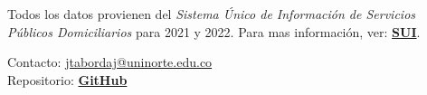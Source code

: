 \documentclass[12pt,a4paper]{article}
\begin{document}
\pagebreak

Todos los datos provienen del \textit{Sistema Único de Información de Servicios Públicos Domiciliarios} para 2021 y 2022. Para mas información, ver: \textbf{\href{http://sui.superservicios.gov.co/Reportes-del-sector/Energia/Reportes-comerciales/Consolidado-Energia-por-Empresa-Departamento-y-Municipio}{SUI}}.

\vfill

\noindent Contacto: \href{mailto:jtabordaj@uninorte.edu.co}{jtabordaj@uninorte.edu.co} \\
Repositorio: \textbf{\href{https://github.com/jtabordaj/research_eslatina}{GitHub}}
\end{document}
